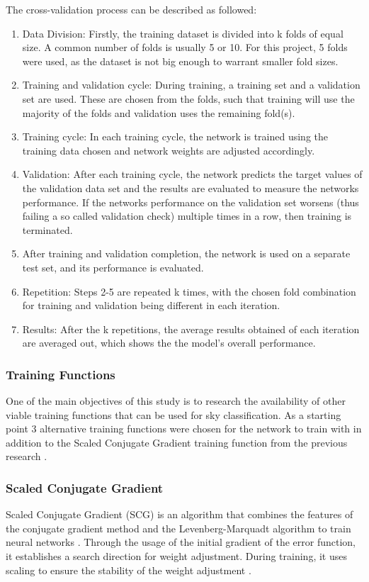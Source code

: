 The cross-validation process can be described as followed:
\begin{enumerate}
	\item Data Division: Firstly, the training dataset is divided into k folds of equal size. A common number of folds is usually 5 or 10. For this project, 5 folds were used, as the dataset is not big enough to warrant smaller fold sizes.
	\item Training and validation cycle: During training, a training set and a validation set are used. These are chosen from the folds, such that training will use the majority of the folds and validation uses the remaining fold(s).
    \item  Training cycle: In each training cycle, the network is trained using the training data chosen and network weights are adjusted accordingly.
    \item Validation: After each training cycle, the network predicts the target values of the validation data set and the results are evaluated to measure the networks performance. If the networks performance on the validation set worsens (thus failing a so called validation check) multiple times in a row, then training is terminated.
    \item After training and validation completion, the network is used on a separate test set, and its performance is evaluated.
    \item Repetition: Steps 2-5 are repeated k times, with the chosen fold combination for training and validation being different in each iteration.
    \item Results: After the k repetitions, the average results obtained of each iteration are averaged out, which shows the the model's overall performance. 
\end{enumerate}
\subsubsection{Training Functions}
One of the main objectives of this study is to research the availability of other viable training functions that can be used for sky classification. As a starting point 3 alternative training functions were chosen for the network to train with in addition to the Scaled Conjugate Gradient training function from the previous research \cite{skyClassANN-Granados-Lopéz}.
\subsubsection{Scaled Conjugate Gradient}
Scaled Conjugate Gradient (SCG) is an algorithm that combines the features of the conjugate gradient method and the Levenberg-Marquadt algorithm to train neural networks \cite{matlab:trainscg}. Through the usage of the initial gradient of the error function, it establishes a search direction for weight adjustment. During training, it uses scaling to ensure the stability of the weight adjustment \cite{Moller-SCG}.
